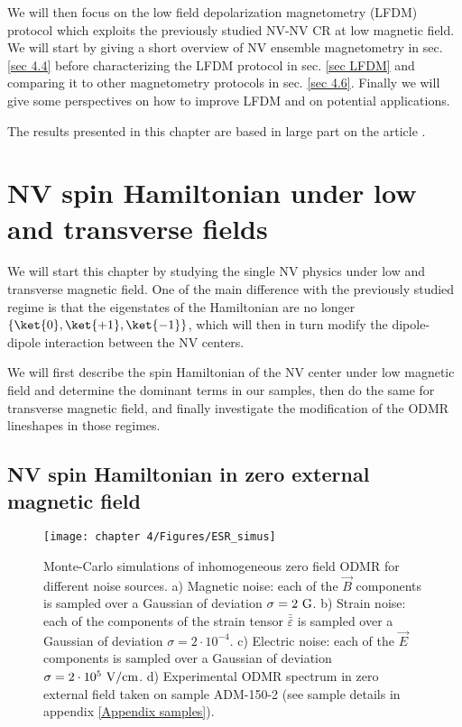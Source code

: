 \documentclass[a4paper, 11pt]{report}
\begin{document}
We will then focus on the low field depolarization magnetometry (LFDM) protocol which exploits the previously studied NV-NV CR at low magnetic field. We will start by giving a short overview of NV ensemble magnetometry in sec. \ref{sec 4.4} before characterizing the LFDM protocol in sec. \ref{sec LFDM} and comparing it to other magnetometry protocols in sec. \ref{sec 4.6}. Finally we will give some perspectives on how to improve LFDM and on potential applications.

The results presented in this chapter are based in large part on the article \citep{pellet2022spin}.

\section{NV spin Hamiltonian under low and transverse fields}
\label{sec 4.1}
We will start this chapter by studying the single NV physics under low and transverse magnetic field. One of the main difference with the previously studied regime is that the eigenstates of the Hamiltonian are no longer $\{ \ket{0}, \ket{+1}, \ket{-1} \}$, which will then in turn modify the dipole-dipole interaction between the NV centers.

We will first describe the spin Hamiltonian of the NV center under low magnetic field and determine the dominant terms in our samples, then do the same for transverse magnetic field, and finally investigate the modification of the ODMR lineshapes in those regimes.

\subsection{NV spin Hamiltonian in zero external magnetic field}
\label{sec. Hamltonian 0 B}
\begin{figure}[h]
\centering
\texttt{[image: chapter 4/Figures/ESR\_simus]}
\caption{Monte-Carlo simulations of inhomogeneous zero field ODMR for different noise sources. a) Magnetic noise: each of the $\vec{B}$ components is sampled over a Gaussian of deviation $\sigma=2\ \rm G$. b) Strain noise: each of the components of the strain tensor $\bar{\bar{\varepsilon}}$ is sampled over a Gaussian of deviation $\sigma=2\cdot 10^{-4}$. c) Electric noise: each of the $\vec{E}$ components is sampled over a Gaussian of deviation $\sigma=2\cdot 10^{5}\ \rm{V/cm}$. d) Experimental ODMR spectrum in zero external field taken on sample ADM-150-2 (see sample details in appendix \ref{Appendix samples}).}
\label{simus ESR}
\end{figure}
\end{document}
